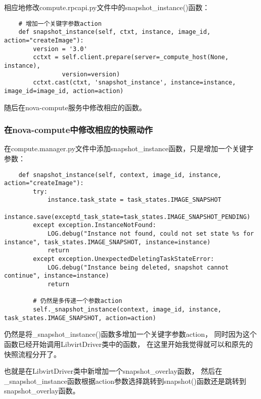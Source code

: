 \documentclass[a4paper,left=1.5cm,right=1.5cm,11pt]{article}
\begin{document}
    相应地修改compute.rpcapi.py文件中的snapshot\_instance()函数：
    \begin{lstlisting}
    # 增加一个关键字参数action
    def snapshot_instance(self, ctxt, instance, image_id, action="createImage"):
        version = '3.0'
        cctxt = self.client.prepare(server=_compute_host(None, instance),
                version=version)
        cctxt.cast(ctxt, 'snapshot_instance', instance=instance, image_id=image_id, action=action)
    \end{lstlisting}

    随后在nova-compute服务中修改相应的函数。

\subsubsection{在nova-compute中修改相应的快照动作}
    在compute.manager.py文件中添加snapshot\_instance函数，只是增加一个关键字参数：
    \begin{lstlisting}
    def snapshot_instance(self, context, image_id, instance, action="createImage"):
        try:
            instance.task_state = task_states.IMAGE_SNAPSHOT
            instance.save(exceptd_task_state=task_states.IMAGE_SNAPSHOT_PENDING)
        except exception.InstanceNotFound:
            LOG.debug("Instance not found, could not set state %s for instance", task_states.IMAGE_SNAPSHOT, instance=instance)
            return
        except exception.UnexpectedDeletingTaskStateError:
            LOG.debug("Instance being deleted, snapshot cannot continue", instance=instance)
            return
        
        # 仍然是多传递一个参数action
        self._snapshot_instance(context, image_id, instance, task_states.IMAGE_SNAPSHOT, action=action)
    \end{lstlisting}

    仍然是将\_snapshot\_instance()函数多增加一个关键字参数action，
    同时因为这个函数已经开始调用LibvirtDriver类中的函数，
    在这里开始我觉得就可以和原先的快照流程分开了。\par

    也就是在LibvirtDriver类中新增加一个snapshot\_overlay函数，
    然后在\_snapshot\_instance函数根据action参数选择跳转到snapshot()函数还是跳转到snapshot\_overlay函数。
\end{document}
